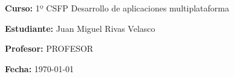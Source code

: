 \documentclass[12pt,a4paper]{article}
\begin{document}
\begin{titlepage}
\begin{minipage}[b]{0.7\textwidth}
            \textbf {\normalsize\textcolor{prussianblue}{Curso:}} \normalsize{1º CSFP Desarrollo de aplicaciones multiplataforma} 

            \textbf{\normalsize \textcolor{prussianblue}{Estudiante:}} \normalsize{Juan Miguel Rivas Velasco}

            \textbf{\normalsize \textcolor{prussianblue}{Profesor:}} \normalsize{PROFESOR}
        \end{minipage}
        
      
    \vspace{1 cm}
    
    \begin{center}
        \textbf{\small \textcolor{prussianblue}{Fecha:}} \small{\today}

        \vfill
    \end{center}
\end{titlepage}

\tableofcontents
\newpage
\end{document}

